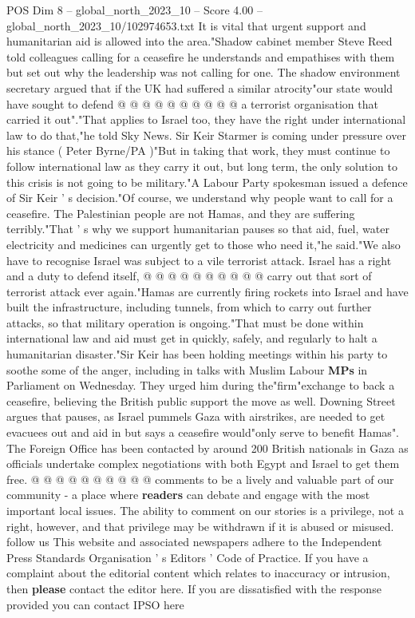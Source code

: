 \begin{textsample}{POS Dim 8 – global\_north\_2023\_10 – Score 4.00 – global\_north\_2023\_10/102974653.txt}
It is vital that urgent support and humanitarian aid is allowed into the area."Shadow cabinet member Steve Reed told colleagues calling for a ceasefire he understands and empathises with them but set out why the leadership was not calling for one.
The shadow environment secretary argued that if the UK had suffered a similar atrocity"our state would have sought to defend @ @ @ @ @ @ @ @ @ @ a terrorist organisation that carried it out"."That applies to Israel too, they have the right under international law to do that,"he told Sky News.
Sir Keir Starmer is coming under pressure over his stance ( Peter Byrne/PA )"But in taking that work, they must continue to follow international law as they carry it out, but long term, the only solution to this crisis is not going to be military."A Labour Party spokesman issued a defence of Sir Keir ' s decision."Of course, we understand why people want to call for a ceasefire.
The Palestinian people are not Hamas, and they are suffering terribly."That ' s why we support humanitarian pauses so that aid, fuel, water electricity and medicines can urgently get to those who need it,"he said."We also have to recognise Israel was subject to a vile terrorist attack.
Israel has a right and a duty to defend itself, @ @ @ @ @ @ @ @ @ @ carry out that sort of terrorist attack ever again."Hamas are currently firing rockets into Israel and have built the infrastructure, including tunnels, from which to carry out further attacks, so that military operation is ongoing."That must be done within international law and aid must get in quickly, safely, and regularly to halt a humanitarian disaster."Sir Keir has been holding meetings within his party to soothe some of the anger, including in talks with Muslim Labour \textbf{MPs} in Parliament on Wednesday.
They urged him during the"firm"exchange to back a ceasefire, believing the British public support the move as well.
Downing Street argues that pauses, as Israel pummels Gaza with airstrikes, are needed to get evacuees out and aid in but says a ceasefire would"only serve to benefit Hamas".
The Foreign Office has been contacted by around 200 British nationals in Gaza as officials undertake complex negotiations with both Egypt and Israel to get them free. @ @ @ @ @ @ @ @ @ @ comments to be a lively and valuable part of our community - a place where \textbf{readers} can debate and engage with the most important local issues.
The ability to comment on our stories is a privilege, not a right, however, and that privilege may be withdrawn if it is abused or misused. follow us This website and associated newspapers adhere to the Independent Press Standards Organisation ' s Editors ' Code of Practice.
If you have a complaint about the editorial content which relates to inaccuracy or intrusion, then \textbf{please} contact the editor here.
If you are dissatisfied with the response provided you can contact IPSO here

\end{textsample}
